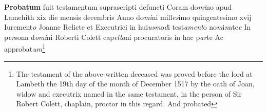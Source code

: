 \documentclass[a4paper,12pt]{article}
\begin{document}
\begin{landscape}
\textbf{Probatum} fuit testamentum suprascripti defuncti Coram do\textit{mi}no apud Lamehith\newline 
xix die mensis decembris Anno do\textit{mi}ni mill\textit{es}imo quingentesimo xvij Iurement\textit{o} Joanne Relicte et\newline 
Executrici in hui\textit{usm}o\textit{d}i test\textit{ament}o no\textit{m}i\textit{n}ate\textit{e} In p\textit{er}sona d\textit{omi}ni Roberti Colett cap\textit{ella}ni procuratoris in hac p\textit{ar}te Ac approbat\textit{um}\footnote{The testament of the above-written deceased was proved before the lord at Lambeth the 19th day of the month of December 1517 by the oath of Joan, widow and executrix named in the same testament, in the person of Sir Robert Colett, chaplain, proctor in this regard. And probated}
\end{landscape}
\end{document}
